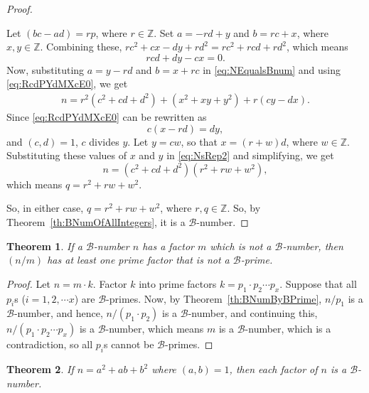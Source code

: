 \documentclass[reqno]{amsart}
\newtheorem{theorem}{Theorem}
\newcommand{\bnum}   {\ensuremath{\mathcal B}-number}
\newcommand{\bprime} {\ensuremath{\mathcal B}-prime}
\newcommand{\bq}[2]{\ensuremath{{#1}^2 + {#1}{#2} + {#2}^2}}
\newcommand{\bqab}{\bq{a}{b}}
\newcommand{\bqcd}{\bq{c}{d}}
\newcommand{\bqxy}{\bq{x}{y}}
\newcommand{\Integer}{\ensuremath{\mathbb{Z}}}
\begin{document}
\begin{proof}
\begin{description}
    Let $(bc-ad) = rp$, where $r \in \Integer$. Set
    $a=-rd+y$ and $b=rc+x$,  where $x,y \in \Integer$.
    Combining these,   $rc^2 + cx - dy + rd^2 = rc^2
    + rcd + rd^2$, which means
    \begin{equation}
      \label{eq:RcdPYdMXcE0}
      rcd + dy - cx = 0.
    \end{equation}
    Now, substituting $a=y-rd$ and $b=x+rc$ in
    \eqref{eq:NEqualsBnum} and using
    \eqref{eq:RcdPYdMXcE0}, we get
    \begin{equation}
      \label{eq:NsRep2}
      \begin{split}
        n = r^2(\bqcd) + (\bqxy) +  r(cy - dx).
      \end{split}
    \end{equation}
    Since \eqref{eq:RcdPYdMXcE0} can be rewritten as
    \begin{equation*}
      c(x - rd) = dy,
    \end{equation*}
    and $(c,d) = 1$, $c$ divides $y$. Let $y = cw$, so that $x = (r+w)d$,
    where $w \in \Integer$.
    Substituting these values of $x$ and $y$ in
    \eqref{eq:NsRep2} and simplifying, we get
    \begin{equation*}
        n = (\bqcd)(\bq{r}{w}),
    \end{equation*}
    which means $q = \bq{r}{w}$.
  \end{description}
  So, in either case, $q = \bq{r}{w}$, where $r, q \in
  \Integer$.  So, by Theorem~\ref{th:BNumOfAllIntegers}, it is a \bnum.
\end{proof}

\begin{theorem}
  \label{th:BNumFactorNonBNum}
  If a \bnum{} $n$ has a factor $m$ which is not a \bnum, then
  $(n/m)$ has at least one prime factor that is not a \bprime.
\end{theorem}

\begin{proof}
  Let $n = m \cdot k$.  Factor $k$ into prime factors $k =
  p_1 \cdot p_2 \cdots p_x$.  Suppose that all $p_i$s ($i = 1, 2, \cdots
  x$) are \bprime{}s.  Now, by Theorem~\ref{th:BNumByBPrime},
  $n/p_1$ is a \bnum, and hence, $n/(p_1 \cdot p_2)$ is a \bnum,
  and continuing this, $n/(p_1 \cdot p_2 \cdots p_x)$ is a \bnum,
  which means $m$ is a \bnum, which is a contradiction, so all
  $p_i$s cannot be \bprime{}s.
\end{proof}

\begin{theorem}
  \label{th:FactorOfBNum}
  If $n = \bqab$ where $(a, b) = 1$, then each factor of
  $n$ is a \bnum.
\end{theorem}
\end{document}
